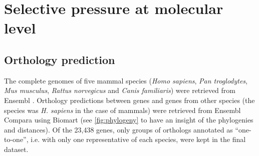 \section{Selective pressure at molecular level}
\label{sec:gssa_mat-met}

\subsection{Orthology prediction}
\label{sec:orthology-prediction}

The complete genomes of five mammal species (\textit{Homo sapiens}, \textit{Pan troglodytes}, \textit{Mus musculus}, \textit{Rattus norvegicus} and \textit{Canis familiaris}) were retrieved from Ensembl \cite{Flicek2011}. Orthology predictions between  genes and genes from other species (the  species was \textit{H. sapiens} in the case of mammals)  were retrieved from Ensembl Compara \cite{Vilella2009} using Biomart \cite{Kinsella2011} (see \autoref{fig:phylogeny} to have an insight of the phylogenies and distances). Of the 23,438  genes, only groups of orthologs annotated as ``one-to-one'', i.e. with only one representative of each species, were kept in the final dataset.

